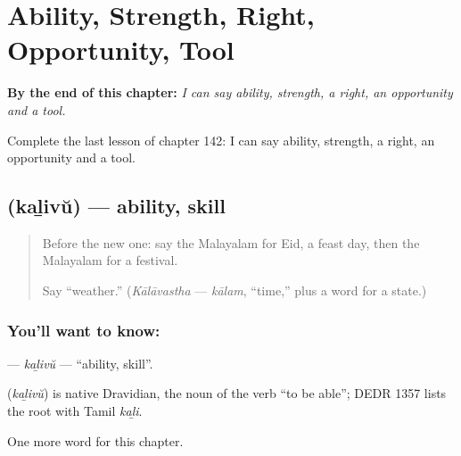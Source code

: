 
\chapter{Ability, Strength, Right, Opportunity, Tool}
\label{ch:ml-ability-strength-right-opportunity-tool}

\begin{chapteropening}
\textbf{By the end of this chapter:} \emph{I can say ability, strength, a right, an opportunity and a tool.}

Complete the last lesson of chapter 142: I can say ability, strength, a right, an opportunity and a tool.
\end{chapteropening}

\section[\texorpdfstring{\ml{കഴിവ്} (kaḻivŭ)}{കഴിവ് (kaḻivŭ)}]{ (kaḻivŭ) — ability, skill}

\label{lesson:ML-C142-kalivu}



\begin{quote}
Before the new one: say the Malayalam for Eid, a feast day, then the Malayalam for a festival.

Say \textquotedblleft{}weather.\textquotedblright{} (\emph{Kālāvastha} — \emph{kālam}, \textquotedblleft{}time,\textquotedblright{} plus a word for a state.)
\end{quote}

\subsection*{You'll want to know: }
\textbf{} — \emph{kaḻivŭ} — \textquotedblleft{}ability, skill\textquotedblright{}.

\begin{cousinweb}
\textbf{} (\emph{kaḻivŭ}) is native Dravidian, the noun of the verb \textquotedblleft{}to be able\textquotedblright{}; DEDR 1357 lists the root with Tamil \emph{kaḻi}.
\end{cousinweb}

\begin{grammarlens}[title={What you've built}]
One more word for this chapter.
\end{grammarlens}

